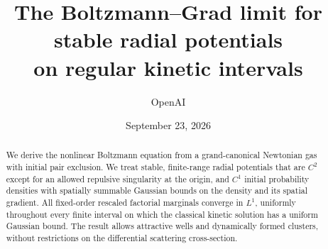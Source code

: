 \documentclass[11pt,letterpaper]{article}
\title{The Boltzmann--Grad limit for stable radial potentials\\
on regular kinetic intervals}
\author{OpenAI}
\date{September 23, 2026}
\numberwithin{equation}{section}
\theoremstyle{definition}
\theoremstyle{plain}
\newcommand{\1}{\mathbf 1}
\begin{document}
\maketitle
\begin{abstract}
We derive the nonlinear Boltzmann equation from a grand-canonical
Newtonian gas with initial pair exclusion. We treat stable, finite-range
radial potentials that are $C^2$ except for an allowed repulsive singularity
at the origin, and $C^1$ initial probability
densities with spatially summable Gaussian bounds on the density and
its spatial gradient.
All fixed-order rescaled factorial marginals converge in $L^1$,
uniformly throughout every finite interval on which the classical
kinetic solution has a uniform Gaussian bound.
The result allows attractive wells and dynamically formed clusters,
without restrictions on the differential scattering cross-section.
\end{abstract}
{\small\tableofcontents}
\clearpage

\clearpage








\end{document}
